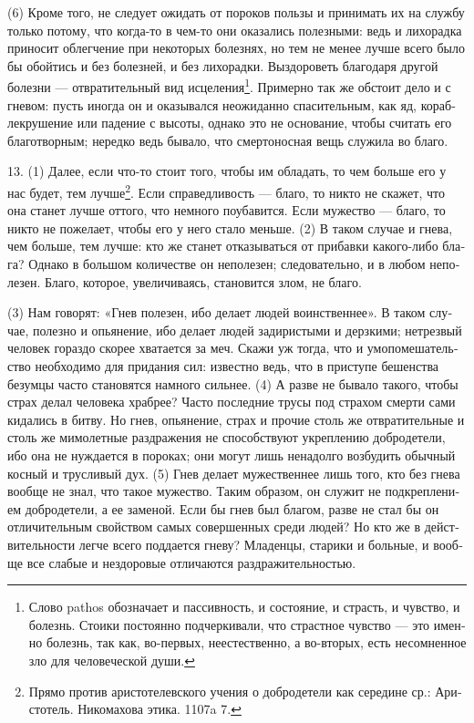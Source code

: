 (6) Кро­ме того, не сле­ду­ет ожи­дать от поро­ков поль­зы и при­ни­мать их на служ­бу толь­ко пото­му, что когда-то в чем-то они ока­за­лись полез­ны­ми: ведь и лихо­рад­ка при­но­сит облег­че­ние при неко­то­рых болез­нях, но тем не менее луч­ше все­го было бы обой­тись и без болез­ней, и без лихо­рад­ки. Выздо­ро­веть бла­го­да­ря дру­гой болез­ни --- отвра­ти­тель­ный вид исцеления\footnote{Сло­во pathos обо­зна­ча­ет и пас­сив­ность, и состо­я­ние, и страсть, и чув­ство, и болезнь. Сто­и­ки посто­ян­но под­чер­ки­ва­ли, что страст­ное чув­ство --- это имен­но болезнь, так как, во-пер­вых, неесте­ствен­но, а во-вто­рых, есть несо­мнен­ное зло для чело­ве­че­ской души.}. При­мер­но так же обсто­ит дело и с гне­вом: пусть ино­гда он и ока­зы­вал­ся неожи­дан­но спа­си­тель­ным, как яд, кораб­ле­кру­ше­ние или паде­ние с высоты, одна­ко это не осно­ва­ние, чтобы счи­тать его бла­готвор­ным; неред­ко ведь быва­ло, что смер­то­нос­ная вещь слу­жи­ла во бла­го.

13. (1) Далее, если что-то сто­ит того, чтобы им обла­дать, то чем боль­ше его у нас будет, тем лучше\footnote{Пря­мо про­тив ари­сто­телев­ско­го уче­ния о доб­ро­де­те­ли как середине ср.: Ари­сто­тель. Нико­ма­хо­ва эти­ка. 1107a 7.}. Если спра­вед­ли­вость --- бла­го, то никто не ска­жет, что она станет луч­ше отто­го, что немно­го поуба­вит­ся. Если муже­ство --- бла­го, то никто не поже­ла­ет, чтобы его у него ста­ло мень­ше. (2) В таком слу­чае и гне­ва, чем боль­ше, тем луч­ше: кто же станет отка­зы­вать­ся от при­бав­ки како­го-либо бла­га? Одна­ко в боль­шом коли­че­стве он непо­ле­зен; сле­до­ва­тель­но, и в любом непо­ле­зен. Бла­го, кото­рое, уве­ли­чи­ва­ясь, ста­но­вит­ся злом, не бла­го.

(3) Нам гово­рят: «Гнев поле­зен, ибо дела­ет людей воин­ст­вен­нее». В таком слу­чае, полез­но и опья­не­ние, ибо дела­ет людей зади­ри­сты­ми и дерз­ки­ми; нетрез­вый чело­век гораздо ско­рее хва­та­ет­ся за меч. Ска­жи уж тогда, что и умо­по­ме­ша­тель­ство необ­хо­ди­мо для при­да­ния сил: извест­но ведь, что в при­сту­пе бешен­ства безум­цы часто ста­но­вят­ся намно­го силь­нее. (4) А раз­ве не быва­ло тако­го, чтобы страх делал чело­ве­ка храбрее? Часто послед­ние тру­сы под стра­хом смер­ти сами кида­лись в бит­ву. Но гнев, опья­не­ние, страх и про­чие столь же отвра­ти­тель­ные и столь же мимо­лет­ные раз­дра­же­ния не спо­соб­ст­ву­ют укреп­ле­нию доб­ро­де­те­ли, ибо она не нуж­да­ет­ся в поро­ках; они могут лишь нена­дол­го воз­будить обыч­ный кос­ный и трус­ли­вый дух. (5) Гнев дела­ет муже­ст­вен­нее лишь того, кто без гне­ва вооб­ще не знал, что такое муже­ство. Таким обра­зом, он слу­жит не под­креп­ле­ни­ем доб­ро­де­те­ли, а ее заме­ной. Если бы гнев был бла­гом, раз­ве не стал бы он отли­чи­тель­ным свой­ст­вом самых совер­шен­ных сре­ди людей? Но кто же в дей­ст­ви­тель­но­сти лег­че все­го под­да­ет­ся гне­ву? Мла­ден­цы, ста­ри­ки и боль­ные, и вооб­ще все сла­бые и нездо­ро­вые отли­ча­ют­ся раз­дра­жи­тель­но­стью.

